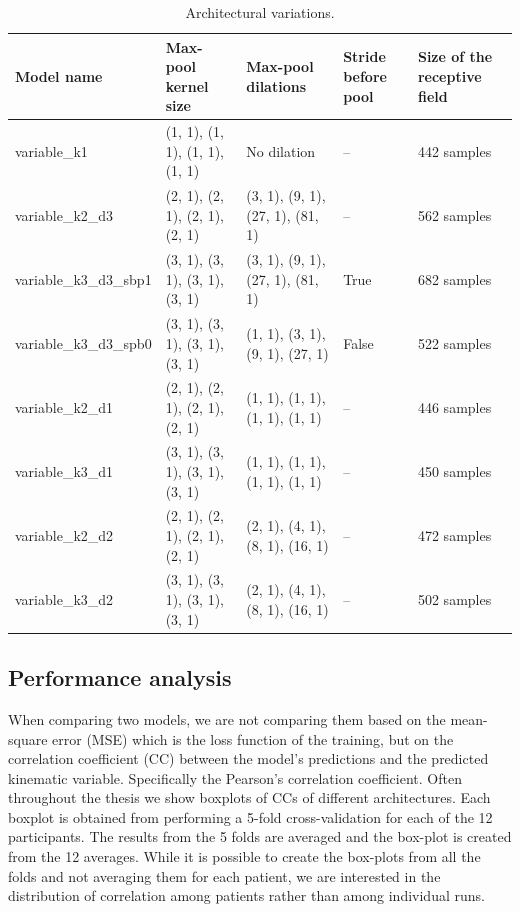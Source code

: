 \begin{table}
\centering
\begin{tabular}{lllll}
\toprule
Model name & Max-pool kernel size & Max-pool dilations & Stride before pool & Size of the receptive field \\
\midrule
variable\_k1 & (1, 1), (1, 1), (1, 1), (1, 1) & No dilation & -- & 442 samples \\
\hline
variable\_k2\_d3 &(2, 1), (2, 1), (2, 1), (2, 1) & (3, 1), (9, 1), (27, 1), (81, 1) & -- & 562 samples \\
\hline
variable\_k3\_d3\_sbp1 & (3, 1), (3, 1), (3, 1), (3, 1) & (3, 1), (9, 1), (27, 1), (81, 1) & True & 682 samples \\
\hline
variable\_k3\_d3\_spb0 & (3, 1), (3, 1), (3, 1), (3, 1) & (1, 1), (3, 1), (9, 1), (27, 1) & False & 522 samples \\
\hline
variable\_k2\_d1 & (2, 1), (2, 1), (2, 1), (2, 1) & (1, 1), (1, 1), (1, 1), (1, 1) & -- & 446 samples \\
\hline
variable\_k3\_d1 &(3, 1), (3, 1), (3, 1), (3, 1) & (1, 1), (1, 1), (1, 1), (1, 1) & -- & 450 samples \\
\hline
variable\_k2\_d2 & (2, 1), (2, 1), (2, 1), (2, 1) & (2, 1), (4, 1), (8, 1), (16, 1) & -- & 472 samples \\
\hline
variable\_k3\_d2 &(3, 1), (3, 1), (3, 1), (3, 1)& (2, 1), (4, 1), (8, 1), (16, 1) & -- & 502 samples \\
\hline
\bottomrule
\end{tabular}
\caption{Architectural variations.}
\end{table}\label{tab:architectures-description}


\subsection{Performance analysis}
When comparing two models, we are not comparing them based on the mean-square error (MSE) which is the loss function of the training, but on the correlation coefficient (CC) between the model's predictions and the predicted kinematic variable.
Specifically the Pearson's correlation coefficient.
Often throughout the thesis we show boxplots of CCs of different architectures.
Each boxplot is obtained from performing a 5-fold cross-validation for each of the 12 participants.
The results from the 5 folds are averaged and the box-plot is created from the 12 averages.
While it is possible to create the box-plots from all the folds and not averaging them for each patient, we are interested in the distribution of correlation among patients rather than among individual runs.